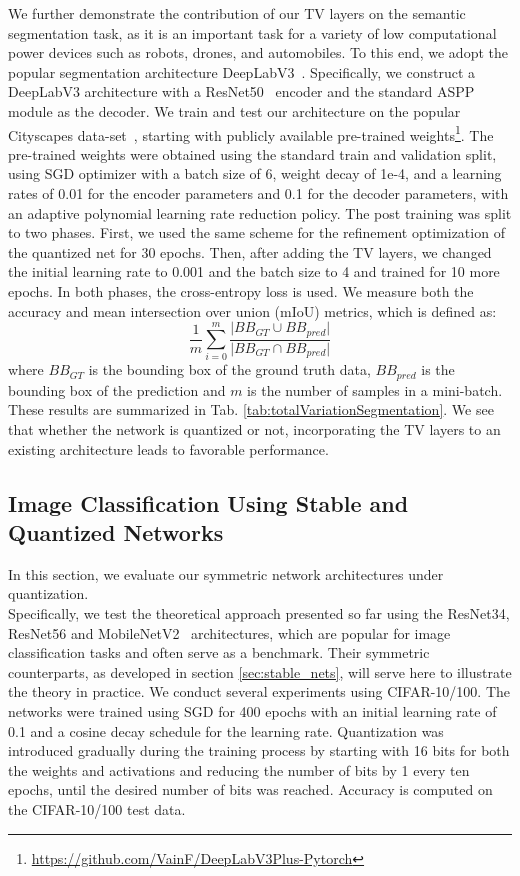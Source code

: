 \documentclass[reqno]{amsart}
\begin{document}
We further demonstrate the contribution of our TV layers on the semantic segmentation task, as it is an important task for a variety of low computational power devices such as robots, drones, and automobiles. To this end, we adopt the popular segmentation architecture DeepLabV3~\cite{chen2017atrous}. Specifically, we construct a DeepLabV3 architecture with a ResNet50~\cite{he2016deep} encoder and the standard ASPP~\cite{chen2017atrous} module as the decoder. 
We train and test our architecture on the popular Cityscapes data-set~\cite{cordts2016cityscapes}, starting with publicly available pre-trained weights\footnote{\url{https://github.com/VainF/DeepLabV3Plus-Pytorch}}. The pre-trained weights were obtained using the standard train and validation split, using SGD optimizer with a batch size of 6, weight decay of 1e-4, and a learning rates of 0.01 for the encoder parameters and 0.1 for the decoder parameters, with an adaptive polynomial learning rate reduction policy. The post training was split to two phases. First, we used the same scheme for the refinement optimization of the quantized net for 30 epochs. Then, after adding the TV layers, we changed the initial learning rate to 0.001 and the batch size to 4 and trained for 10 more epochs. In both phases, the cross-entropy loss is used.
We measure both the accuracy and mean intersection over union (mIoU) metrics, which is defined as:
\[
    \frac{1}{m} \sum_{i=0}^m{\frac{\vert BB_{GT} \cup BB_{pred} \vert}
                                    {\vert BB_{GT} \cap BB_{pred} \vert}}
\]
where $BB_{GT}$ is the bounding box of the ground truth data, $BB_{pred}$ is the bounding box of the prediction and $m$ is the number of samples in a mini-batch. These results are summarized in Tab. \ref{tab:totalVariationSegmentation}. We see that whether the network is quantized or not, incorporating the TV layers to an existing architecture leads to favorable performance.

\subsection{\textbf{Image Classification Using Stable and Quantized Networks}}
\label{sub:experiment_cnns}
In this section, we evaluate our symmetric network architectures under quantization.\\Specifically, we test the theoretical approach presented so far using the ResNet34, ResNet56 \cite{he2016deep} and MobileNetV2~\cite{sandler2018mobilenetv2} architectures, which are popular for image classification tasks and often serve as a benchmark. Their symmetric counterparts, as developed in section \ref{sec:stable_nets}, will serve here to illustrate the theory in practice.  We conduct several experiments using CIFAR-10/100. The networks were trained using SGD for 400 epochs with an initial learning rate of 0.1 and a cosine decay schedule for the learning rate. Quantization was introduced gradually during the training process by starting with 16 bits for both the weights and activations and reducing the number of bits by 1 every ten epochs, until the desired number of bits was reached. Accuracy is computed on the CIFAR-10/100 test data.
\end{document}
